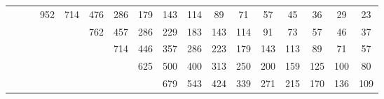 \begin{xltabular}{\linewidth}{c CCCCCCCCCCCCCCCC}
			&				&				&	952		&	714		&	476	&	286	&	179	&	143	&	114	&	89		&	71		&	57		&	45		&	36		&	29		&	23 \\
			&				&				&				&				&	762	&	457	&	286	&	229	&	183	&	143	&	114	&	91		&	73		&	57		&	46		&	37 \\
			&				&				&				&				&			&	714	&	446	&	357	&	286	&	223	&	179	&	143	&	113	&	89		&	71		&	57 \\
			&				&				&				&				&			&			&	625	&	500	&	400	&	313	&	250	&	200	&	159	&	125	&	100	&	80 \\
			&				&				&				&				&			&			&			&	679	&	543	&	424	&	339	&	271	&	215	&	170	&	136	&	109 \\
\end{xltabular}





